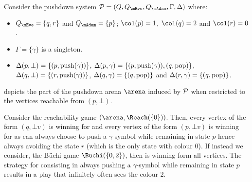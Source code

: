 \begin{example}\label{11-ex:pushdown-game-1}
Consider the pushdown system $\PDS = (Q,Q_{\mEve}, Q_{\mAdam}, \Gamma,\Delta)$ where:
\begin{itemize}
	\item $Q_{\mEve}=\{q,r\}$ and $Q_{\mAdam}=\{p\}$; $\pdscol{p} = 1$, $\pdscol{q} = 2$ and $\pdscol{r} = 0$.
	\item $\Gamma=\{\gamma\}$ is a singleton.
	\item $\Delta(p,\bot) = \{(p,\mathrm{push}(\gamma))\}$, $\Delta(p,\gamma) = \{(p,\mathrm{push}(\gamma)),(q,\mathrm{pop})\}$, $\Delta(q,\bot) = \{(r,\mathrm{push}(\gamma))\}$, $\Delta(q,\gamma) = \{(q,\mathrm{pop})\}$ and $\Delta(r,\gamma) = \{(q,\mathrm{pop})\}$.
\end{itemize}

 depicts the part of the pushdown arena $\arena$ induced by $\mathcal{P}$ when restricted to the vertices reachable from $(p,\bot)$.

Consider the reachability game $(\arena, \Reach(\{0\}))$. Then, every vertex of the form $(q,\bot v)$ is winning for \Eve and every vertex of the form $(p,\bot v)$ is winning for \Adam as \Adam can always choose to push a $\gamma$-symbol while remaining in state $p$ hence always avoiding the state $r$ (which is the only state with colour $0$). If instead we consider, the B\"uchi game $\Buchi(\{0,2\})$, then \Eve is winning form all vertices. The strategy for \Adam consisting in always pushing a $\gamma$-symbol while remaining in state $p$ results in a play that infinitely often sees the colour $2$.

\begin{figure}[htb]
\begin{center}
\end{center}
\end{figure}
\end{example}
